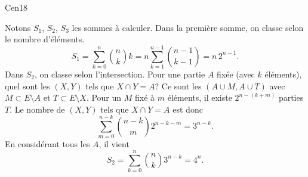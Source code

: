 \begin{tiny}Cen18\end{tiny} Notons $S_1$, $S_2$, $S_3$ les sommes à calculer.\newline
Dans la première somme, on classe selon le nombre d'éléments.
\[
 S_1 = \sum_{k=0}^n\binom{n}{k}k
 = n \sum_{k=1}^{n-1}\binom{n-1}{k-1} = n\,2^{n-1}. 
\]
Dans $S_2$, on classe selon l'intersection. Pour une partie $A$ fixée (avec $k$ éléments), quel sont les $(X,Y)$ tels que $X\cap Y = A$? Ce sont les $(A\cup M, A\cup T)$ avec 
$M \subset E \setminus A$ et $T\subset E \setminus X$.\newline
Pour un $M$ fixé à $m$ éléments, il existe $2^{n-(k+m)}$ parties $T$. Le nombre de $(X,Y)$ tels que $X \cap Y = A$ est donc
\[
 \sum_{m=0}^{n-k}\binom{n-k}{m}2^{n-k-m} = 3^{n-k}.
\]
En considérant tous les $A$, il vient
\[
 S_2 = \sum_{k=0}^{n}\binom{n}{k}3^{n-k} = 4^n.
\]

